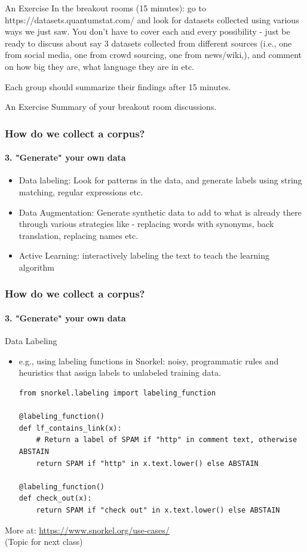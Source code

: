 \documentclass{beamer}
\begin{document}
\begin{frame}{An Exercise}
In the breakout rooms (15 minutes): go to https://datasets.quantumstat.com/ and look for datasets collected using various ways we just saw. You don't have to cover each and every possibility - just be ready to discuss about say 3 datasets collected from different sources (i.e., one from social media, one from crowd sourcing, one from news/wiki,), and comment on how big they are, what language they are in etc.

Each group should summarize their findings after 15 minutes. 
\end{frame}

\begin{frame}{An Exercise}
Summary of your breakout room discussions.
\end{frame}

\begin{frame}[fragile]
\frametitle{How do we collect a corpus?}
\framesubtitle{3. "Generate" your own data}
\begin{itemize}
    \item Data labeling: Look for patterns in the data, and generate labels using string matching, regular expressions etc.
    \item Data Augmentation: Generate synthetic data to add to what is already there through various strategies like - replacing words with synonyms, back translation, replacing names etc.
    \item Active Learning: interactively labeling the text to teach the learning algorithm 
\end{itemize}
\end{frame}

\begin{frame}[fragile]
\frametitle{How do we collect a corpus?}
\framesubtitle{3. "Generate" your own data}
Data Labeling
\begin{itemize}
\item e.g., using labeling functions in Snorkel: noisy, programmatic rules and heuristics that assign labels to unlabeled training data. 
    \tiny
    \begin{verbatim}
from snorkel.labeling import labeling_function

@labeling_function()
def lf_contains_link(x):
    # Return a label of SPAM if "http" in comment text, otherwise ABSTAIN
    return SPAM if "http" in x.text.lower() else ABSTAIN

@labeling_function()
def check_out(x):
    return SPAM if "check out" in x.text.lower() else ABSTAIN

\end{verbatim}
\end{itemize}
More at: \url{https://www.snorkel.org/use-cases/} \\ (Topic for next class)
\end{frame}
\end{document}
